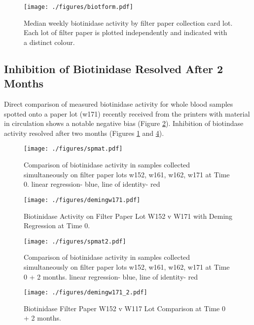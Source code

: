 \documentclass[review]{elsarticle}
\begin{document}
\begin{figure}[htbp]
\centering
\texttt{[image: ./figures/biotform.pdf]}
\caption{\label{fig:orgace0a4f}Median weekly biotinidase activity by filter paper collection card lot. Each lot of filter paper is plotted independently and indicated with a distinct colour.}
\end{figure}

\clearpage

\subsection*{Inhibition of Biotinidase Resolved After 2 Months}
\label{sec:org295e592}
Direct comparison of measured biotinidase activity for whole blood
samples spotted onto a paper lot (w171) recently received from the
printers with material in circulation shows a notable negative
bias (Figure \ref{fig:org5c5bfc1}). Inhibition of biotindase activity resolved after two months
(Figures \ref{fig:orgace0a4f} and \ref{fig:org9ce1064}).

\begin{figure}[htbp]
\centering
\texttt{[image: ./figures/spmat.pdf]}
\caption{\label{fig:org5c5bfc1}Comparison of biotinidase activity in samples collected simultaneously on filter paper lots w152, w161, w162, w171 at Time 0. linear regression- blue, line of identity- red}
\end{figure}

\begin{figure}[htbp]
\centering
\texttt{[image: ./figures/demingw171.pdf]}
\caption{\label{fig:org05e8d2b}Biotinidase Activity on Filter Paper Lot W152 v W171 with Deming Regression at Time 0.}
\end{figure}
\clearpage

\begin{figure}[htbp]
\centering
\texttt{[image: ./figures/spmat2.pdf]}
\caption{\label{fig:org9ce1064}Comparison of biotinidase activity in samples collected simultaneously on filter paper lots w152, w161, w162, w171 at Time 0 + 2 months. linear regression- blue, line of identity- red}
\end{figure}

\begin{figure}[htbp]
\centering
\texttt{[image: ./figures/demingw171\_2.pdf]}
\caption{\label{fig:org2477e2a}Biotinidase Filter Paper W152 v W117 Lot Comparison at Time 0 + 2 months.}
\end{figure}
\end{document}
